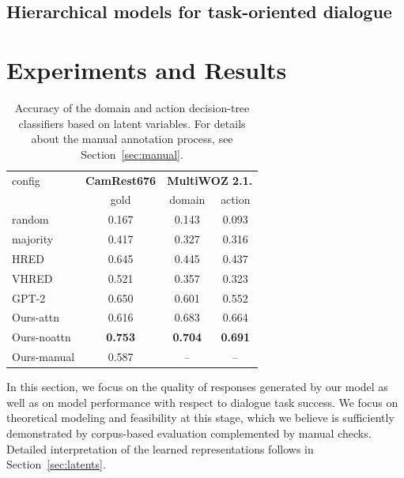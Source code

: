 \subsection{Hierarchical models for task-oriented dialogue}

\section{Experiments and Results}

\begin{table}[t]
    \centering\small
    \begin{tabular}{l|c|cc}
      \toprule
      config & \textbf{CamRest676} & \multicolumn{2}{c}{\textbf{MultiWOZ 2.1.}} \\
       & gold & domain & action \\
      \midrule
      random  & 0.167 & 0.143 & 0.093 \\
      majority &  0.417 & 0.327 & 0.316 \\\hdashline[0.5pt/2pt]
      HRED & 0.645 & 0.445 & 0.437 \\
      VHRED & 0.521 & 0.357 & 0.323 \\
      GPT-2 & 0.650 & 0.601 & 0.552 \\
      Ours-attn & 0.616 & 0.683 & 0.664 \\
      Ours-noattn & \textbf{0.753} &  \textbf{0.704} & \textbf{0.691} \\\hdashline[0.5pt/2pt]
      Ours-manual & 0.587 & -- & -- \\

      \bottomrule
  \end{tabular}
  \caption{Accuracy of the domain and action decision-tree classifiers based on latent variables. 
  For details about the manual annotation process, see Section~\ref{sec:manual}.}
  \label{tab:latent_classification}
\end{table}


In this section, we focus on the quality of responses generated by our model as well as on model performance with respect to dialogue task success.
We focus on theoretical modeling and feasibility at this stage, which we believe is sufficiently demonstrated by corpus-based evaluation complemented by manual checks. Detailed interpretation of the learned representations follows in Section~\ref{sec:latents}.

